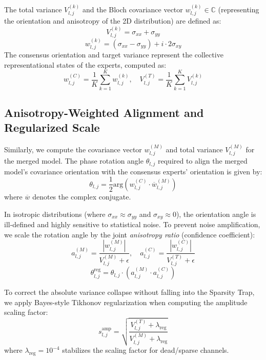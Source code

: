 \documentclass{article}
\begin{document}
The total variance $V^{(k)}_{l, j}$ and the Bloch covariance vector $w^{(k)}_{l, j} \in \mathbb{C}$ (representing the orientation and anisotropy of the 2D distribution) are defined as:
\begin{equation}
    V^{(k)}_{l, j} = \sigma_{xx} + \sigma_{yy}
\end{equation}
\begin{equation}
    w^{(k)}_{l, j} = (\sigma_{xx} - \sigma_{yy}) + i \cdot 2\sigma_{xy}
\end{equation}
The consensus orientation and target variance represent the collective representational states of the experts, computed as:
\begin{equation}
    w^{(C)}_{l, j} = \frac{1}{K} \sum_{k=1}^K w^{(k)}_{l, j}, \quad V^{(T)}_{l, j} = \frac{1}{K} \sum_{k=1}^K V^{(k)}_{l, j}
\end{equation}

\subsection{Anisotropy-Weighted Alignment and Regularized Scale}
Similarly, we compute the covariance vector $w^{(M)}_{l, j}$ and total variance $V^{(M)}_{l, j}$ for the merged model. The phase rotation angle $\theta_{l, j}$ required to align the merged model's covariance orientation with the consensus experts' orientation is given by:
\begin{equation}
    \theta_{l, j} = \frac{1}{2} \text{arg}\left( w^{(C)}_{l, j} \cdot \overline{w}^{(M)}_{l, j} \right)
\end{equation}
where $\overline{w}$ denotes the complex conjugate. 

In isotropic distributions (where $\sigma_{xx} \approx \sigma_{yy}$ and $\sigma_{xy} \approx 0$), the orientation angle is ill-defined and highly sensitive to statistical noise. To prevent noise amplification, we scale the rotation angle by the joint \textit{anisotropy ratio} (confidence coefficient):
\begin{equation}
    a^{(M)}_{l, j} = \frac{|w^{(M)}_{l, j}|}{V^{(M)}_{l, j} + \epsilon}, \quad a^{(C)}_{l, j} = \frac{|w^{(C)}_{l, j}|}{V^{(T)}_{l, j} + \epsilon}
\end{equation}
\begin{equation}
    \theta^{\text{reg}}_{l, j} = \theta_{l, j} \cdot \left( a^{(M)}_{l, j} \cdot a^{(C)}_{l, j} \right)
\end{equation}

To correct the absolute variance collapse without falling into the Sparsity Trap, we apply Bayes-style Tikhonov regularization when computing the amplitude scaling factor:
\begin{equation}
    s^{\text{amp}}_{l, j} = \sqrt{\frac{V^{(T)}_{l, j} + \lambda_{\text{reg}}}{V^{(M)}_{l, j} + \lambda_{\text{reg}}}}
\end{equation}
where $\lambda_{\text{reg}} = 10^{-4}$ stabilizes the scaling factor for dead/sparse channels.
\end{document}
